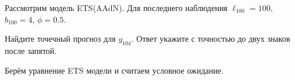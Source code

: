 
\begin{question}
Рассмотрим модель ETS(AAdN).
Для последнего наблюдения \(\ell_{100} = 100\), \(b_{100} = 4\), \(\phi = 0.5\).

Найдите точечный прогноз для \(y_{104}\). Ответ укажите с точностью до двух знаков после запятой.
\end{question}

\begin{solution}
Берём уравнение ETS модели и считаем условное ожидание.
\end{solution}

